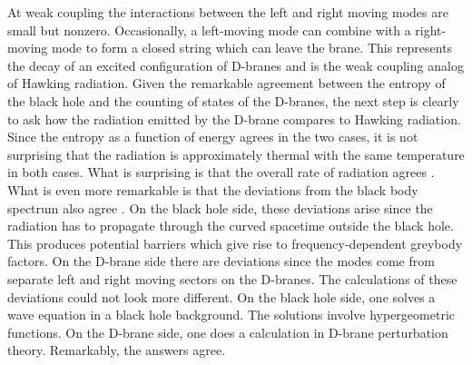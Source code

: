 \documentclass[12pt]{article}
\begin{document}
At weak coupling the interactions between the left and right moving
modes  are small but nonzero. Occasionally, a left-moving mode
can combine with a right-moving mode to form a closed string which
can leave the brane. This represents the decay of an excited configuration
of D-branes and is the weak coupling analog of Hawking radiation.
Given the remarkable agreement between the entropy of the black hole
and the counting of states of the D-branes, the next step is clearly 
to ask how the radiation emitted by the D-brane compares to Hawking
radiation.  
Since the entropy as a function of energy
agrees in the two cases, it is not surprising that the radiation is
approximately thermal with the same temperature in both cases. What
is surprising is that the overall rate of radiation agrees \cite{dama}.
What is even more remarkable is that the deviations from the
black body spectrum also agree \cite{mast2}. 
On the black hole side, these deviations
arise since the radiation has to propagate through the curved spacetime
outside the black hole. This produces potential barriers which give
rise to frequency-dependent greybody factors. On the D-brane side
there are deviations since the modes come from separate 
left and right moving
sectors on the  D-branes. The calculations of these deviations
could not look more
different.
On the black hole side, one solves a wave equation in a black hole 
background. The solutions involve hypergeometric functions. On the
D-brane side, one does a calculation in D-brane perturbation theory.
Remarkably, the answers agree.
\end{document}
